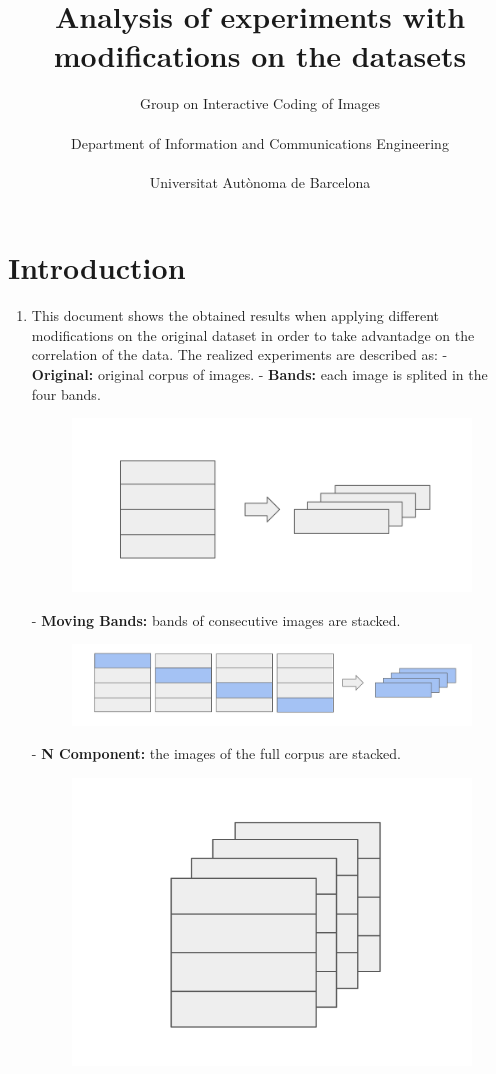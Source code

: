 \documentclass{article}
\title{Analysis of experiments with modifications on the datasets}
\author{Group on Interactive Coding of Images\\ \\
Department of Information and Communications Engineering\\ \\
Universitat Autònoma de Barcelona}
\date{}
\begin{document}
\maketitle


\section*{Introduction}
\begin{enumerate}
    \item This document shows the obtained results when applying different modifications on the original dataset in order to take advantadge on the correlation of the data. The realized experiments are described as: 
        \subitem- \textbf{Original:} original corpus of images.
        \subitem- \textbf{Bands:} each image is splited in the four bands.
        \begin{figure}[h!]
    \centering
    \includegraphics[scale=0.3]{img_1.png}
\end{figure}
        \subitem- \textbf{Moving Bands:} bands of consecutive images are stacked.
        \begin{figure}[h!]
    \centering
    \includegraphics[scale=0.3]{img_3.png}
\end{figure}
        \subitem- \textbf{N Component:} the images of the full corpus are stacked.
        \begin{figure}[h!]
    \centering
    \includegraphics[scale=0.3]{img_2.png}

\end{figure}
\end{enumerate}
\end{document}
